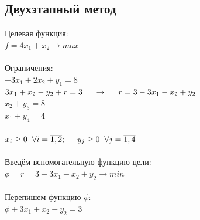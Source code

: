 \documentclass[14pt,a4paper,fleqn]{extarticle}
\begin{document}
\subsection*{Двухэтапный метод}
Целевая функция:\\
$f = 4x_1+x_2 \longrightarrow max$\\\\
Ограничения:\\
$-3x_1 + 2x_2 + y_1 = 8$\\
$3x_1 + x_2 - y_2 + r = 3 \hspace*{0.5cm} \rightarrow \hspace*{0.5cm} r = 3 - 3x_1 - x_2 + y_2$\\
$x_2 + y_3 = 8$\\
$x_1 + y_4 = 4$\\\\
$x_i \geq 0 \hspace{0.2cm} \forall i = \overline{1,2}; \hspace{0.5cm} y_j \geq 0 \hspace{0.2cm} \forall j =  \overline{1,4}$\\\\
Введём вспомогательную функцию цели:\\
$\phi = r = 3 - 3x_1 - x_2 + y_2 \longrightarrow min$\\\\
Перепишем функцию $\phi$:\\
$\phi + 3x_1 + x_2 - y_2 = 3$
\end{document}
